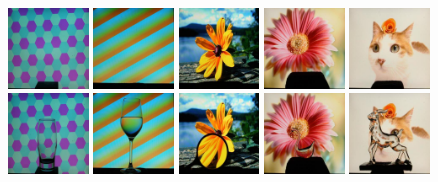     \includegraphics[width=0.16\textwidth]{ch-tomnet/images/Dataset/real_data_Glass_303_bg.jpg}
    \includegraphics[width=0.16\textwidth]{ch-tomnet/images/Dataset/real_data_Water_064_bg.jpg}
    \includegraphics[width=0.16\textwidth]{ch-tomnet/images/Dataset/real_data_Lens_041_bg.jpg}
    \includegraphics[width=0.16\textwidth]{ch-tomnet/images/Dataset/real_data_Cplx_221_bg.jpg}
    \includegraphics[width=0.16\textwidth]{ch-tomnet/images/Dataset/real_data_Cplx_168_bg.jpg}
    \\
    \includegraphics[width=0.16\textwidth]{ch-tomnet/images/Dataset/real_data_Glass_303.jpg}
    \includegraphics[width=0.16\textwidth]{ch-tomnet/images/Dataset/real_data_Water_064.jpg}
    \includegraphics[width=0.16\textwidth]{ch-tomnet/images/Dataset/real_data_Lens_041.jpg}
    \includegraphics[width=0.16\textwidth]{ch-tomnet/images/Dataset/real_data_Cplx_221.jpg}
    \includegraphics[width=0.16\textwidth]{ch-tomnet/images/Dataset/real_data_Cplx_168.jpg}
    \\
